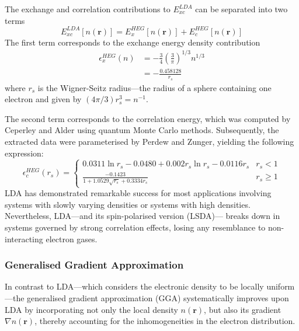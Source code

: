 The exchange and correlation contributions to $E_{xc}^{LDA}$ can be separated into two terms 
\begin{equation}
  \label{eq59}
  E_{xc}^{LDA}[n(\mathbf{r})] = E_x^{HEG}[n(\mathbf{r})] + E_c^{HEG}[n(\mathbf{r})]
\end{equation}
The first term corresponds to the exchange energy density contribution
\begin{equation}
  \label{eq60}
  \begin{aligned}
    \epsilon_x^{HEG}(n) &= -\frac{3}{4} \left(\frac{3}{\pi}\right)^{1/3} n^{1/3}\\
    &= -\frac{0.458128}{r_s}
  \end{aligned}
\end{equation}
where $r_s$ is the Wigner-Seitz radius---the radius of a sphere containing one electron and given by $(4\pi/3)r_s^3 = n^{-1}$.

The second term corresponds to the correlation energy, which was computed by Ceperley and Alder\supercite{Ceperley1980} using quantum Monte Carlo methods. Subsequently, the extracted data were parameterised by Perdew and Zunger\supercite{Perdew1981}, yielding the following expression:
\begin{equation}
  \label{eq61}
  \epsilon_c^{HEG}(r_s) = \begin{cases} 
    0.0311\ln{r_s} - 0.0480 + 0.002 r_s \ln{r_s} - 0.0116 r_s& r_s < 1\\
   \displaystyle \frac{-0.1423}{1 + 1.0529\sqrt{r_s} + 0.3334 r_s}& r_s \geq 1
  \end{cases}
\end{equation}
LDA has demonstrated remarkable success for most applications involving systems with slowly varying densities or systems with high densities. Nevertheless, LDA---and its spin-polarised version (LSDA)---
breaks down in systems governed by strong correlation effects, losing any resemblance to non-interacting electron gases.   

\subsubsection{Generalised Gradient Approximation}
In contrast to LDA---which considers the electronic density to be locally uniform---the generalised gradient approximation (GGA) systematically improves upon LDA by incorporating not only the local density $n(\mathbf{r})$, but also its gradient $\nabla n(\mathbf{r})$, thereby accounting for the inhomogeneities in the electron distribution.  

